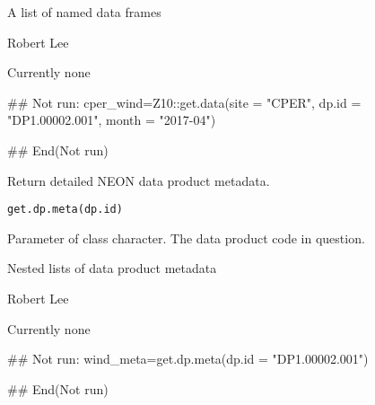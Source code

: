 \documentclass[a4paper]{book}
\begin{document}
%
\begin{Value}
A list of named data frames
\end{Value}
%
\begin{Author}\relax
Robert Lee \\{}
\end{Author}
%
\begin{SeeAlso}\relax
Currently none
\end{SeeAlso}
%
\begin{Examples}
\begin{ExampleCode}
## Not run: 
cper_wind=Z10::get.data(site = "CPER", dp.id = "DP1.00002.001", month = "2017-04")

## End(Not run)
\end{ExampleCode}
\end{Examples}
%
\begin{Description}\relax
Return detailed NEON data product metadata.
\end{Description}
%
\begin{Usage}
\begin{verbatim}
get.dp.meta(dp.id)
\end{verbatim}
\end{Usage}
%
\begin{Arguments}
\begin{ldescription}
\item[\code{dp.id}] Parameter of class character. The data product code in question.
\end{ldescription}
\end{Arguments}
%
\begin{Value}
Nested lists of data product metadata
\end{Value}
%
\begin{Author}\relax
Robert Lee \\{}
\end{Author}
%
\begin{SeeAlso}\relax
Currently none
\end{SeeAlso}
%
\begin{Examples}
\begin{ExampleCode}
## Not run: 
wind_meta=get.dp.meta(dp.id = "DP1.00002.001")

## End(Not run)
\end{ExampleCode}
\end{Examples}
\end{document}
